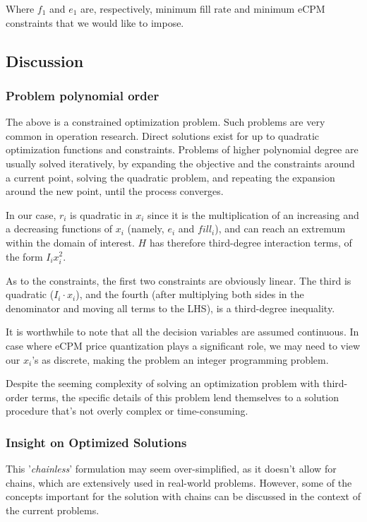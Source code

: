 \documentclass{article}
\begin{document}
\begin{large}
Where $f_1$ and $e_1$ are, respectively, minimum fill rate and minimum eCPM constraints that we would like to impose.

\subsection{Discussion}
\subsubsection{Problem polynomial order}
The above is a constrained optimization problem. Such problems are very common in operation research. Direct solutions exist for up to quadratic optimization functions and constraints. Problems of higher polynomial degree are usually solved iteratively, by expanding the objective and the constraints around a current point, solving the quadratic problem, and repeating the expansion around the new point, until the process converges.

In our case, $r_i$ is quadratic in $x_i$ since it is the multiplication of an increasing and a decreasing functions of $x_i$ (namely, $e_i$ and $fill_i$), and can reach an extremum within the domain of interest. $H$ has therefore third-degree interaction terms, of the form $I_i x^2_i$. 

As to the constraints, the first two constraints are obviously linear. The third is quadratic ($I_i \cdot x_i$), and the fourth (after multiplying both sides in the denominator and moving all terms to the LHS), is a third-degree inequality.

It is worthwhile to note that all the decision variables are assumed continuous. In case where eCPM price quantization plays a significant role, we may need to view our $x_i$'s as discrete, making the problem an integer programming problem.

Despite the seeming complexity of solving an optimization problem with third-order terms, the specific details of this problem lend themselves to a solution procedure that's not overly complex or time-consuming.

\subsubsection{Insight on Optimized Solutions}
This '\emph{chainless}' formulation may seem over-simplified, as it doesn't allow for  chains, which are extensively used in real-world problems. However, some of the concepts important for the solution with chains can be discussed in the context of the current problems.


\end{large}
\end{document}
